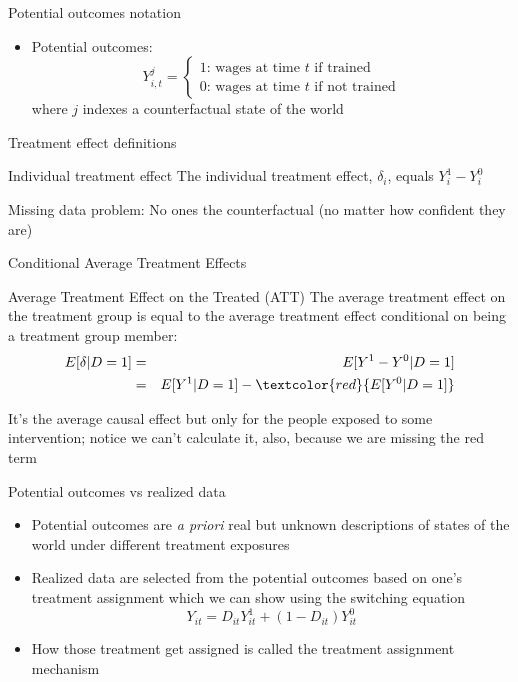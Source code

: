 \documentclass{beamer}
\begin{document}
\begin{frame}{Potential outcomes notation}
	
	\begin{itemize}

	\item Potential outcomes: $$Y_{i,t}^j =\begin{cases} 1 \text{: wages at time $t$ if trained} \\ 0 \text{: wages at time $t$ if not trained} \end{cases}$$where $j$ indexes a counterfactual state of the world

	\end{itemize}
\end{frame}



\begin{frame}{Treatment effect definitions}


	\begin{block}{Individual treatment effect}
	    The individual treatment effect,  $\delta_i$, equals $Y_i^1-Y_i^0$
	\end{block}

Missing data problem:  No ones the counterfactual (no matter how confident they are)
	
\end{frame}


\begin{frame}{Conditional Average Treatment Effects}	
	\begin{block}{Average Treatment Effect on the Treated (ATT)}
	The average treatment effect on the treatment group is equal to the average treatment effect conditional on being a treatment group member:
		\begin{eqnarray*}
		E[\delta|D=1]&=&E[Y^1-Y^0|D=1] \nonumber \\
		&=&E[Y^1|D=1]-\textcolor{red}{E[Y^0|D=1]}
		\end{eqnarray*}
	\end{block}
	
	\bigskip

It's the average causal effect but only for the people exposed to some intervention; notice we can't calculate it, also, because we are missing the red term

	
\end{frame}

\begin{frame}{Potential outcomes vs realized data}

\begin{itemize}
\item Potential outcomes are \emph{a priori} real but unknown descriptions of states of the world under different treatment exposures
\item Realized data are selected from the potential outcomes based on one's treatment assignment which we can show using the switching equation
 $$Y_{it}=D_{it}Y_{it}^1 + (1-D_{it})Y_{it}^0$$
\item How those treatment get assigned is called the treatment assignment mechanism

\end{itemize}
\end{frame}
\end{document}
